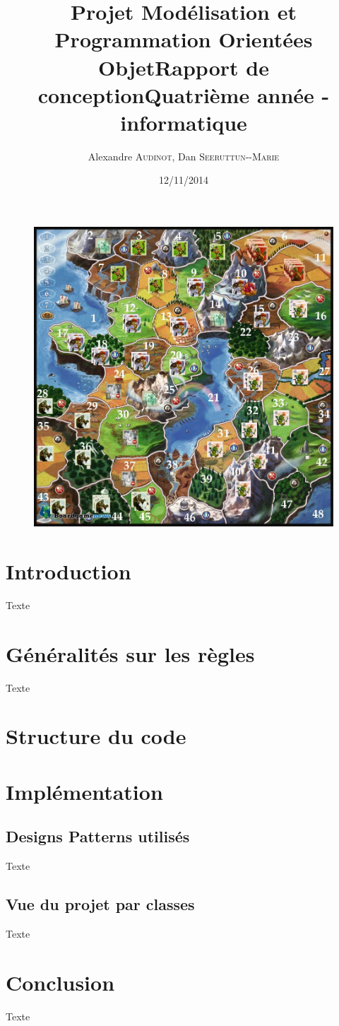 \documentclass[12pt]{article}
\title{Projet Modélisation et Programmation Orientées Objet\smallbreak Rapport de conception\smallbreak Quatrième année - informatique }
\author{Alexandre \textsc{Audinot},  Dan \textsc{Seeruttun-{}-Marie}}
\date{12/11/2014}
\begin{document}
\maketitle

\begin{figure}[!h] 
\centerline{\includegraphics[scale=0.30]{img/cover.jpg}}
\end{figure}
\newpage

%


\newpage
\tableofcontents
\newpage


\section{Introduction}
Texte
\newpage
\section{Généralités sur les règles}
Texte
\newpage
\section{Structure du code}

\section{Implémentation}
\subsection{Designs Patterns utilisés}
Texte
\subsection{Vue du projet par classes}
Texte
\newpage
\section{Conclusion}
Texte
\end{document}
